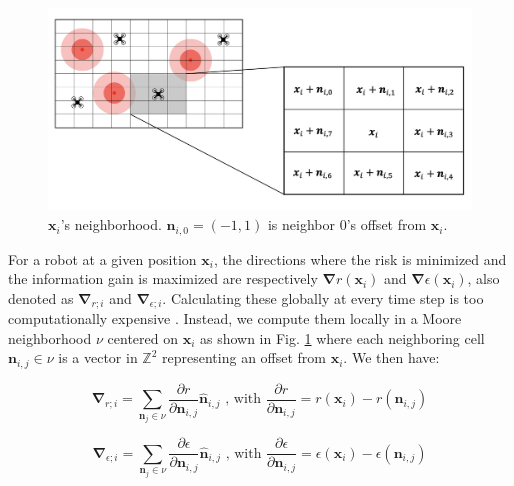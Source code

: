 \begin{figure}[htbp]
	\centering
    \includegraphics[width=0.95\columnwidth]{images/Moore.png}
    \caption{$\bm{x}_i$'s neighborhood. $\bm{n}_{i,0} = (-1, 1)$ is neighbor 0's offset from $\bm{x}_i$.}
    \label{neighborhood}
\end{figure}

For a robot at a given position $\bm{x}_i$, the directions where the
risk is minimized and the information gain is maximized are
respectively $\bm{\nabla}r(\bm{x}_i)$ and
$\bm{\nabla}\epsilon(\bm{x}_i)$, also denoted as $\bm{\nabla}_{r;i}$
and $\bm{\nabla}_{\epsilon;i}$. Calculating these globally at every
time step is too computationally expensive
\cite{dames2012decentralized,schwagerMultirobotControlPolicy2017}. Instead,
we compute them locally in a Moore neighborhood $\nu$ centered on
$\bm{x}_i$ as shown in Fig. \ref{neighborhood} where each neighboring
cell $\bm{n}_{i,j} \in \nu$ is a vector in $\mathbb{Z}^2$ representing
an offset from $\bm{x}_i$. We then have:

\begin{equation}
    \bm{\nabla}_{r;i} = \sum_{\bm{n}_j \in \nu}\frac{\partial r}{\partial \bm{n}_{i,j}} \bm{\hat{n}}_{i,j} \text{ , with } \frac{\partial r}{\partial \bm{n}_{i,j}} = r(\bm{x}_i) - r(\bm{n}_{i,j})
    \label{eq:gradient_risk}
\end{equation}

\begin{equation}
    \bm{\nabla}_{\epsilon;i} = \sum_{\bm{n}_j \in \nu}\frac{\partial \epsilon}{\partial \bm{n}_{i,j}} \bm{\hat{n}}_{i,j} \text{ , with } \frac{\partial \epsilon}{\partial \bm{n}_{i,j}} = \epsilon(\bm{x}_i) - \epsilon(\bm{n}_{i,j})
    \label{eq:gradient_exploration}
\end{equation}


